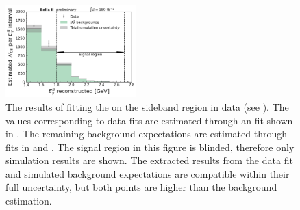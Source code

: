 \begin{figure}[htbp!]
    \centering
    \includegraphics[width=0.45\textwidth]{figures/data_validation/sidebands_background_vs_data.pdf}
    \caption{\label{fig:sidebands_background_versus_data} The results of fitting the \Mbc on the sideband region in data (see ).
    The values corresponding to data fits are estimated through an \Mbc fit shown in .
    The remaining-\BB background expectations are estimated through \Mbc fits in  and .
    The signal region in this figure is blinded, therefore only simulation results are shown.
    The extracted results from the data fit and simulated background expectations 
    are compatible within their full uncertainty, but both points are higher than the background estimation.
    }
\end{figure}

